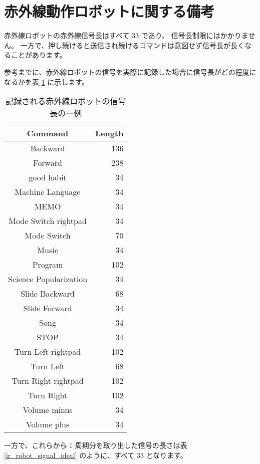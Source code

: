 \section{赤外線動作ロボットに関する備考} \label{ir_robot_notice}
赤外線ロボットの赤外線信号長はすべて 33 であり、
信号長制限にはかかりません。
一方で、押し続けると送信され続けるコマンドは意図せず信号長が長くなることがあります。

参考までに、赤外線ロボットの信号を実際に記録した場合に信号長がどの程度になるかを表 \ref{ir_robot_signal} に示します。

\begin{table}[htbp]
    \caption{記録される赤外線ロボットの信号長の一例}
    \label{ir_robot_signal}
    \begin{tabular}{c|r}
Command & Length \\
\hline
Backward & 136 \\
Forward & 238 \\
good habit & 34 \\
Machine Language & 34 \\
MEMO & 34 \\
Mode Switch rightpad & 34 \\
Mode Switch & 70 \\
Music & 34 \\
Program & 102 \\
Science Popularization & 34 \\
Slide Backward & 68 \\
Slide Forward & 34 \\
Song & 34 \\
STOP & 34 \\
Turn Left rightpad & 102 \\
Turn Left & 68 \\
Turn Right rightpad & 102 \\
Turn Right & 102 \\
Volume minus & 34 \\
Volume plus & 34
    \end{tabular}
\end{table}

一方で、これらから 1 周期分を取り出した信号の長さは表 \ref{ir_robot_signal_ideal} のように、すべて 33 となります。

